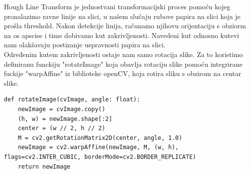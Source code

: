 \documentclass{article}
\begin{document}
Hough Line Transform je jednostvani transformacijski proces pomoću kojeg pronalazimo ravne linije na slici, u našem slučaju rubove papira na slici koja je prošla threshold. Nakon detekcije linija, računamo njihovu orijentaciju s obziorm na os apscise i time dobivamo kut zakrivljenosti. Navedeni kut odnosno kutevi nam olakšavaju postizanje uspravnosti papira na slici.\\

Određenim kutem zakrivljenosti ostaje nam samo rotacija slike. Za to koristimo definiranu funckiju "rotateImage" koja obavlja rotaciju slike pomoću integrirane fuckije "warpAffine" iz biblioteke openCV, koja rotira sliku s obzirom na centar slike. %
\begin{lstlisting}
def rotateImage(cvImage, angle: float):
    newImage = cvImage.copy()
    (h, w) = newImage.shape[:2]
    center = (w // 2, h // 2)
    M = cv2.getRotationMatrix2D(center, angle, 1.0)
    newImage = cv2.warpAffine(newImage, M, (w, h), flags=cv2.INTER_CUBIC, borderMode=cv2.BORDER_REPLICATE)
    return newImage
\end{lstlisting}
\end{document}

